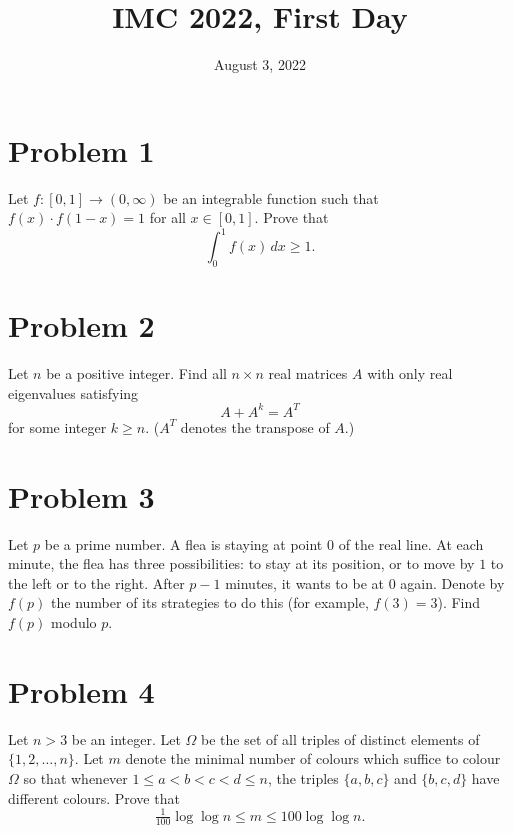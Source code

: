 \documentclass{article}
\title{IMC 2022, First Day}
\date{August 3, 2022}
\begin{document}
\maketitle

\section*{Problem 1}
Let $f : [0,1] \to (0, \infty)$ be an integrable function such that $f(x) \cdot f(1-x) = 1$ for all $x \in [0,1]$. Prove that
\[ \int_0^1 f(x)\, dx \geq 1. \]

\section*{Problem 2}
Let $n$ be a positive integer. Find all $n \times n$ real matrices $A$ with only real eigenvalues satisfying
\[ A + A^k = A^T \]
for some integer $k \geq n$. ($A^T$ denotes the transpose of $A$.)

\section*{Problem 3}
Let $p$ be a prime number. A flea is staying at point $0$ of the real line. At each minute, the flea has three possibilities: to stay at its position, or to move by $1$ to the left or to the right. After $p-1$ minutes, it wants to be at $0$ again. Denote by $f(p)$ the number of its strategies to do this (for example, $f(3) = 3$). Find $f(p)$ modulo $p$.

\section*{Problem 4}
Let $n > 3$ be an integer. Let $\Omega$ be the set of all triples of distinct elements of $\{1, 2, \ldots, n\}$. Let $m$ denote the minimal number of colours which suffice to colour $\Omega$ so that whenever $1 \leq a < b < c < d \leq n$, the triples $\{a,b,c\}$ and $\{b,c,d\}$ have different colours. Prove that
\[ \tfrac{1}{100} \log \log n \leq m \leq 100 \log \log n. \]
\end{document}
